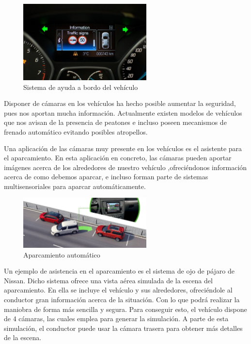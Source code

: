 \begin{figure}[H]
  \begin{center}
    \includegraphics[width=0.6\textwidth]{figures/Introduccion/deteccion_senales.jpg}
		\caption{Sistema de ayuda a bordo del vehículo}
		\label{fig.deteccion_senales}
		\end{center}
\end{figure}

Disponer de cámaras en los vehículos ha hecho posible aumentar la seguridad, pues nos aportan mucha información. Actualmente existen modelos de vehículos que nos avisan de la presencia de peatones e incluso poseen mecanismos de frenado automático evitando posibles atropellos.

Una aplicación de las cámaras muy presente en los vehículos es el asistente para el aparcamiento.  En esta aplicación en concreto, las cámaras pueden aportar imágenes acerca de los alrededores de nuestro vehículo ,ofreciéndonos información acerca de como debemos aparcar, e incluso forman parte de  sistemas multisensoriales para aparcar automáticamente.

\begin{figure}[H]
  \begin{center}
    \includegraphics[width=0.6\textwidth]{figures/Introduccion/aparcamiento_automatico.jpg}
		\caption{Aparcamiento automático}
		\label{fig.aparcamiento_automatico}
		\end{center}
\end{figure}

Un ejemplo de asistencia en el aparcamiento es el sistema de ojo de pájaro de Nissan. Dicho sistema ofrece una vista aérea simulada de la escena del aparcamiento. En ella se incluye el vehículo y sus alrededores, ofreciéndole al conductor gran información acerca de la situación. Con lo que podrá realizar la maniobra de forma más sencilla y segura. Para conseguir esto, el vehículo dispone de 4 cámaras, las cuales emplea para generar la simulación. A parte de esta simulación, el conductor puede usar la cámara trasera para obtener más detalles de la escena.

